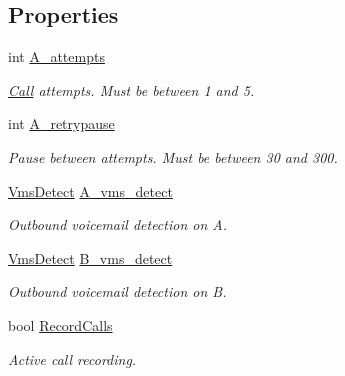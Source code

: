 \subsection*{Properties}
\begin{DoxyCompactItemize}
\item 
int \hyperlink{class_thecallr_api_1_1_objects_1_1_click_to_call_1_1_click_to_call_options_a18020bbe178aa228739f72ff272d294c}{A\+\_\+attempts}
\begin{DoxyCompactList}\small\item\em \hyperlink{class_thecallr_api_1_1_objects_1_1_click_to_call_1_1_call}{Call} attempts. Must be between 1 and 5. \end{DoxyCompactList}\item 
int \hyperlink{class_thecallr_api_1_1_objects_1_1_click_to_call_1_1_click_to_call_options_a47a08184c5029968eeb0e2101ea5ac32}{A\+\_\+retrypause}
\begin{DoxyCompactList}\small\item\em Pause between attempts. Must be between 30 and 300. \end{DoxyCompactList}\item 
\hyperlink{class_thecallr_api_1_1_objects_1_1_app_1_1_param_1_1_vms_detect}{Vms\+Detect} \hyperlink{class_thecallr_api_1_1_objects_1_1_click_to_call_1_1_click_to_call_options_a21d86e0a6155d85c43a58cb3f036d848}{A\+\_\+vms\+\_\+detect}
\begin{DoxyCompactList}\small\item\em Outbound voicemail detection on A. \end{DoxyCompactList}\item 
\hyperlink{class_thecallr_api_1_1_objects_1_1_app_1_1_param_1_1_vms_detect}{Vms\+Detect} \hyperlink{class_thecallr_api_1_1_objects_1_1_click_to_call_1_1_click_to_call_options_a152d2e17b82893a32cb9dc9c37056321}{B\+\_\+vms\+\_\+detect}
\begin{DoxyCompactList}\small\item\em Outbound voicemail detection on B. \end{DoxyCompactList}\item 
bool \hyperlink{class_thecallr_api_1_1_objects_1_1_click_to_call_1_1_click_to_call_options_af5d2a462fe9021bf9401acf1bd14f542}{Record\+Calls}
\begin{DoxyCompactList}\small\item\em Active call recording. \end{DoxyCompactList}\end{DoxyCompactItemize}


